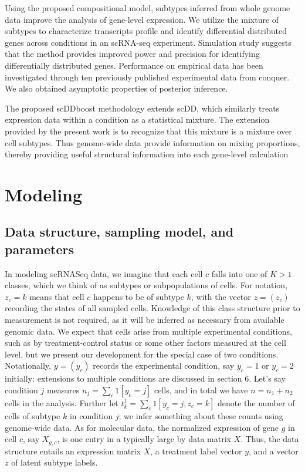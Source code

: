 \documentclass[11pt]{amsart}
\begin{document}
 
Using the proposed compositional model, subtypes inferred from whole genome data 
improve the analysis of gene-level expression.  We utilize the mixture of subtypes to 
characterize transcripts profile and identify differential distributed genes across conditions in an scRNA-seq experiment.
Simulation study suggests that the method provides improved power and precision for identifying differentially distributed genes. 
Performance on empirical data has been investigated through ten previously published experimental data from conquer\cite{ref:Cq}. 
We also obtained asymptotic properties of posterior inference. 

The proposed scDDboost methodology extends scDD\cite{ref:scDD}, which similarly treats expression data within a condition as a statistical mixture.   
The extension provided by the present work is to recognize that this mixture is a mixture over cell subtypes.  
Thus genome-wide data provide information on mixing proportions, thereby providing useful
structural information into each gene-level calculation

\section{Modeling}
\subsection{Data structure, sampling model, and parameters}

In modeling scRNASeq data, we
imagine that each cell $c$ falls into one of $K>1$ classes, which we think of as
subtypes or subpopulations of cells. For notation, $z_c=k$ means that cell $c$ happens to be of subtype $k$, with the vector $z=(z_c)$ recording
the states of all sampled cells.  Knowledge of this class structure
 prior to measurement is not required, as it will be inferred as necessary from
 available genomic data.   We expect that cells arise from multiple
experimental conditions, such as by treatment-control status or some other factors
 measured at the cell level, but we present our development for the special
case of two conditions.  Notationally, $y=(y_c)$ records the experimental condition, say $y_c=1$ or $y_c=2$ initially:
extensions to multiple conditions are discussed in section 6. Let's say condition $j$ measures $n_j=\sum_{c} 1[y_c=j]$ cells,  and
in total we have $n=n_1+n_2$ cells in the analysis.  Further let $t^j_k = \sum_c 1[y_c=j, z_c=k]$ denote the number of cells of subtype $k$ in condition $j$;
we infer something about these counts using genome-wide data.  As for molecular data, the 
normalized expression of gene $g$ in cell $c$, say $X_{g,c}$, is one entry
in a typically large {} by {} data matrix $X$.  Thus, the data structure entails an expression matrix
$X$, a treatment label vector $y$, and a vector $z$ of latent subtype labels.
\end{document}
